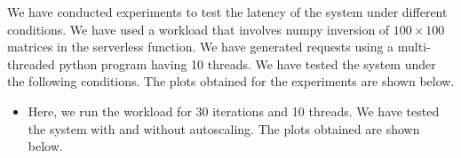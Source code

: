 \documentclass{article}
\begin{document}
We have conducted experiments to test the latency of the system under different conditions. We have used a workload that involves numpy inversion of $100 \times 100$ matrices in the serverless function. We have generated requests using a multi-threaded python program having 10 threads. We have tested the system under the following conditions. The plots obtained for the experiments are shown below.

\begin{itemize}
    \item Here, we run the workload for 30 iterations and 10 threads. We have tested the system with and without autoscaling. The plots obtained are shown below.
    
    

\end{itemize}
\end{document}

